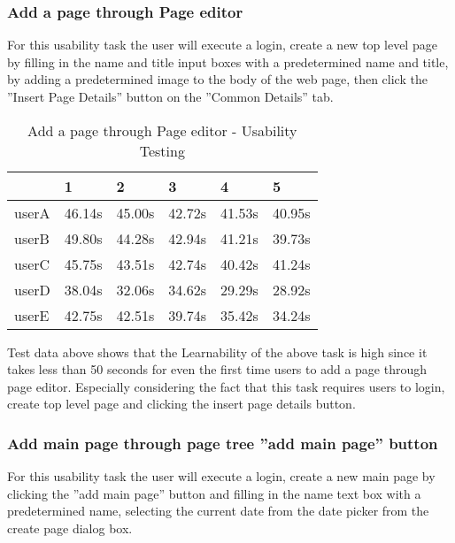 \documentclass[12pt]{article}
\begin{document}
  
\subsubsection{Add a page through Page editor}
For this usability task the user will execute a login, create a new top level page by filling in the name and title input boxes with a predetermined name and title, by adding a predetermined image to the body of the web page, then click the ''Insert Page Details'' button on the ''Common Details'' tab.  
 
 \begin{table}[H]
\centering
\caption{Add a page through Page editor - Usability Testing}
\begin{tabular}{|l|l|l|l|l|l|}
\hline
      & 1      & 2      & 3      & 4      & 5      \\ \hline
userA & 46.14s & 45.00s & 42.72s & 41.53s & 40.95s \\ \hline
userB & 49.80s & 44.28s & 42.94s & 41.21s & 39.73s \\ \hline
userC & 45.75s & 43.51s & 42.74s & 40.42s & 41.24s \\ \hline
userD & 38.04s & 32.06s & 34.62s & 29.29s & 28.92s \\ \hline
userE & 42.75s & 42.51s & 39.74s & 35.42s & 34.24s \\ \hline
\end{tabular}
\end{table}

Test data above shows that the Learnability of the above task is high since it takes less than 50 seconds for even the first time users to add a page through page editor. Especially considering the fact that this task requires users to login, create top level page and clicking the insert page details button.
 
  
  \subsubsection{Add main page through page tree ''add main page'' button}
  For this usability task the user will execute a login, create a new main page by clicking the ''add main page'' button and filling in the name text box with a predetermined name, selecting the current date from the date picker from the create page dialog box.
  
\end{document}
